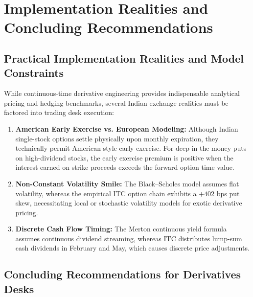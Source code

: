
\section{Implementation Realities and Concluding Recommendations}
\label{sec:limitations_conclusions}

\subsection{Practical Implementation Realities and Model Constraints}

While continuous-time derivative engineering provides indispensable analytical pricing and hedging benchmarks, several Indian exchange realities must be factored into trading desk execution:
\begin{enumerate}[leftmargin=1.5em, itemsep=1pt, parsep=0pt, label=(\alph*)]
    \item \textbf{American Early Exercise vs. European Modeling:} Although Indian single-stock options settle physically upon monthly expiration, they technically permit American-style early exercise. For deep-in-the-money puts on high-dividend stocks, the early exercise premium is positive when the interest earned on strike proceeds exceeds the forward option time value.
    \item \textbf{Non-Constant Volatility Smile:} The Black--Scholes model assumes flat volatility, whereas the empirical ITC option chain exhibits a $+402$ bps put skew, necessitating local or stochastic volatility models for exotic derivative pricing.
    \item \textbf{Discrete Cash Flow Timing:} The Merton continuous yield formula assumes continuous dividend streaming, whereas ITC distributes lump-sum cash dividends in February and May, which causes discrete price adjustments.
\end{enumerate}

\subsection{Concluding Recommendations for Derivatives Desks}

